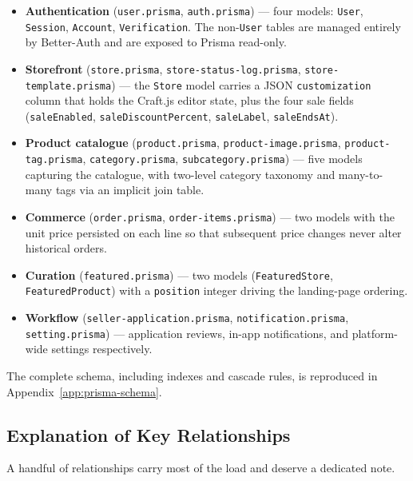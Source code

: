 \documentclass[12pt, a4paper, oneside]{report}
\begin{document}
\begin{itemize}[leftmargin=*,itemsep=2pt]
  \item \textbf{Authentication} (\texttt{user.prisma},
        \texttt{auth.prisma}) --- four models: \texttt{User},
        \texttt{Session}, \texttt{Account}, \texttt{Verification}.
        The non-\texttt{User} tables are managed entirely by
        Better-Auth and are exposed to Prisma read-only.
  \item \textbf{Storefront} (\texttt{store.prisma},
        \texttt{store-status-log.prisma},
        \texttt{store-template.prisma}) --- the \texttt{Store} model
        carries a JSON \texttt{customization} column that holds the
        Craft.js editor state, plus the four sale fields
        (\texttt{saleEnabled}, \texttt{saleDiscountPercent},
        \texttt{saleLabel}, \texttt{saleEndsAt}).
  \item \textbf{Product catalogue} (\texttt{product.prisma},
        \texttt{product-image.prisma}, \texttt{product-tag.prisma},
        \texttt{category.prisma}, \texttt{subcategory.prisma}) ---
        five models capturing the catalogue, with two-level
        category taxonomy and many-to-many tags via an implicit
        join table.
  \item \textbf{Commerce} (\texttt{order.prisma},
        \texttt{order-items.prisma}) --- two models with the unit
        price persisted on each line so that subsequent price
        changes never alter historical orders.
  \item \textbf{Curation} (\texttt{featured.prisma}) --- two
        models (\texttt{FeaturedStore}, \texttt{FeaturedProduct})
        with a \texttt{position} integer driving the landing-page
        ordering.
  \item \textbf{Workflow} (\texttt{seller-application.prisma},
        \texttt{notification.prisma}, \texttt{setting.prisma})
        --- application reviews, in-app notifications, and
        platform-wide settings respectively.
\end{itemize}

The complete schema, including indexes and cascade rules, is
reproduced in Appendix~\ref{app:prisma-schema}.

\subsection{Explanation of Key Relationships}

A handful of relationships carry most of the load and deserve a
dedicated note.
\end{document}
